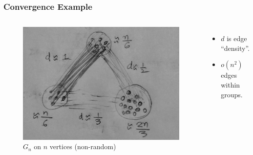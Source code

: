 \documentclass{beamer}
\begin{document}
  \begin{frame}
    \frametitle{Convergence Example}
    \begin{columns}
	\begin{figure}
	  \centering
	  \includegraphics[totalheight=5cm]{./Images/Graphs.jpg}
	  \caption{$G_n$ on $n$ vertices (non-random)}
	  \label{fig:graphs}
	\end{figure}
      \begin{itemize}
	\item $d$ is edge ``density''.
	\item $o(n^2)$ edges within groups.
      \end{itemize}
    \end{columns}
  \end{frame}
\end{document}
